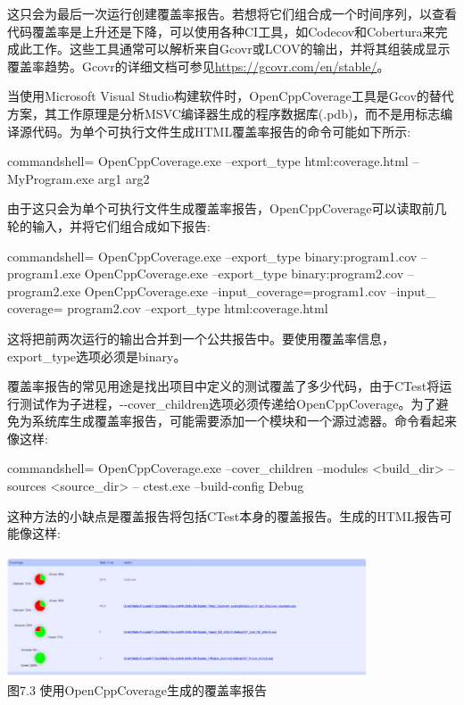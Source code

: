 这只会为最后一次运行创建覆盖率报告。若想将它们组合成一个时间序列，以查看代码覆盖率是上升还是下降，可以使用各种CI工具，如Codecov和Cobertura来完成此工作。这些工具通常可以解析来自Gcovr或LCOV的输出，并将其组装成显示覆盖率趋势。Gcovr的详细文档可参见\url{https://gcovr.com/en/stable/}。


当使用Microsoft Visual Studio构建软件时，OpenCppCoverage工具是Gcov的替代方案，其工作原理是分析MSVC编译器生成的程序数据库(.pdb)，而不是用标志编译源代码。为单个可执行文件生成HTML覆盖率报告的命令可能如下所示:

\begin{tcblisting}{commandshell={}}
OpenCppCoverage.exe --export_type html:coverage.html --
  MyProgram.exe arg1 arg2
\end{tcblisting}

由于这只会为单个可执行文件生成覆盖率报告，OpenCppCoverage可以读取前几轮的输入，并将它们组合成如下报告:

\begin{tcblisting}{commandshell={}}
OpenCppCoverage.exe --export_type binary:program1.cov --
  program1.exe
OpenCppCoverage.exe --export_type binary:program2.cov --
  program2.exe
OpenCppCoverage.exe --input_coverage=program1.cov --input_
coverage= program2.cov --export_type html:coverage.html
\end{tcblisting}

这将把前两次运行的输出合并到一个公共报告中。要使用覆盖率信息，export\_type选项必须是binary。

覆盖率报告的常见用途是找出项目中定义的测试覆盖了多少代码，由于CTest将运行测试作为子进程，-{}-cover\_children选项必须传递给OpenCppCoverage。为了避免为系统库生成覆盖率报告，可能需要添加一个模块和一个源过滤器。命令看起来像这样:

\begin{tcblisting}{commandshell={}}
OpenCppCoverage.exe --cover_children --modules <build_dir> --
  sources <source_dir> -- ctest.exe --build-config Debug
\end{tcblisting}

这种方法的小缺点是覆盖报告将包括CTest本身的覆盖报告。生成的HTML报告可能像这样:

\begin{center}
\includegraphics[width=0.8\textwidth]{content/2/chapter7/images/3.jpg}\\
图7.3 使用OpenCppCoverage生成的覆盖率报告
\end{center}

